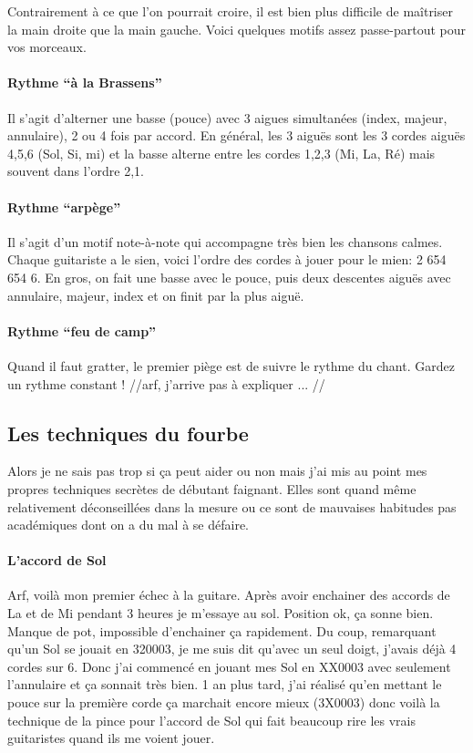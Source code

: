 \documentclass[a4paper,twoside]{article}
\begin{document}
Contrairement à ce que l'on pourrait croire, il est bien plus
difficile de maîtriser la main droite que la main gauche.
Voici quelques motifs assez passe-partout pour vos morceaux.

\paragraph{Rythme ``à la Brassens''} Il s'agit d'alterner une basse (pouce)
avec 3 aigues simultanées (index, majeur, annulaire), 2 ou 4 fois par
accord. En général, les 3 aiguës sont les 3 cordes aiguës 4,5,6 (Sol,
Si, mi) et la basse alterne entre les cordes 1,2,3 (Mi, La, Ré) mais
souvent dans l'ordre 2,1.

\paragraph{Rythme ``arpège''} Il s'agit d'un motif note-à-note qui
accompagne très bien les chansons calmes. Chaque guitariste a le
sien, voici l'ordre des cordes à jouer pour le mien: 2 654 654 6. En
gros, on fait une basse avec le pouce, puis deux descentes aiguës avec
annulaire, majeur, index et on finit par la plus aiguë.

\paragraph{Rythme ``feu de camp''} Quand il faut gratter, le premier
piège est de suivre le rythme du chant. Gardez un rythme constant !
//arf, j'arrive pas à expliquer ... //


\subsection{Les techniques du fourbe}

Alors je ne sais pas trop si ça peut aider ou non mais j'ai mis au
point mes propres techniques secrètes de débutant faignant. Elles sont
quand même relativement déconseillées dans la mesure ou ce sont de
mauvaises habitudes pas académiques dont on a du mal à se défaire.

\paragraph{L'accord de Sol}
Arf, voilà mon premier échec à la guitare. Après avoir enchainer des
accords de La et de Mi pendant 3 heures je m'essaye au sol. Position
ok, ça sonne bien. Manque de pot, impossible d'enchainer ça
rapidement.  Du coup, remarquant qu'un Sol se jouait en 320003, je me
suis dit qu'avec un seul doigt, j'avais déjà 4 cordes sur 6. Donc j'ai
commencé en jouant mes Sol en XX0003 avec seulement l'annulaire et ça
sonnait très bien. 1 an plus tard, j'ai réalisé qu'en mettant le pouce
sur la première corde ça marchait encore mieux (3X0003) donc voilà la
technique de la pince pour l'accord de Sol qui fait beaucoup rire les
vrais guitaristes quand ils me voient jouer.
\end{document}
